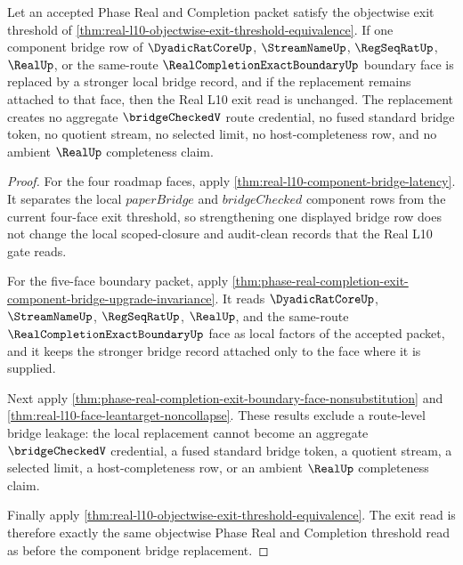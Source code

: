 \begin{theorem}
\label{thm:real-l10-boundary-face-bridge-locality}
Let an accepted Phase Real and Completion packet satisfy the objectwise exit
threshold of \autoref{thm:real-l10-objectwise-exit-threshold-equivalence}.
If one component bridge row of $\DyadicRatCoreUp$, $\StreamNameUp$,
$\RegSeqRatUp$, $\RealUp$, or the same-route
$\RealCompletionExactBoundaryUp$ boundary face is replaced by a stronger local
bridge record, and if the replacement remains attached to that face, then the
Real L10 exit read is unchanged. The replacement creates no aggregate
$\bridgeCheckedV$ route credential, no fused standard bridge token, no quotient
stream, no selected limit, no host-completeness row, and no ambient $\RealUp$
completeness claim.
\end{theorem}
\begin{proof}
For the four roadmap faces, apply
\autoref{thm:real-l10-component-bridge-latency}. It separates the local
$paperBridge$ and $bridgeChecked$ component rows from the current four-face
exit threshold, so strengthening one displayed bridge row does not change the
local scoped-closure and audit-clean records that the Real L10 gate reads.

For the five-face boundary packet, apply
\autoref{thm:phase-real-completion-exit-component-bridge-upgrade-invariance}.
It reads $\DyadicRatCoreUp$, $\StreamNameUp$, $\RegSeqRatUp$, $\RealUp$, and
the same-route $\RealCompletionExactBoundaryUp$ face as local factors of the
accepted packet, and it keeps the stronger bridge record attached only to the
face where it is supplied.

Next apply
\autoref{thm:phase-real-completion-exit-boundary-face-nonsubstitution} and
\autoref{thm:real-l10-face-leantarget-noncollapse}. These results exclude a
route-level bridge leakage: the local replacement cannot become an aggregate
$\bridgeCheckedV$ credential, a fused standard bridge token, a quotient stream,
a selected limit, a host-completeness row, or an ambient $\RealUp$ completeness
claim.

Finally apply
\autoref{thm:real-l10-objectwise-exit-threshold-equivalence}. The exit read is
therefore exactly the same objectwise Phase Real and Completion threshold read
as before the component bridge replacement.
\end{proof}

